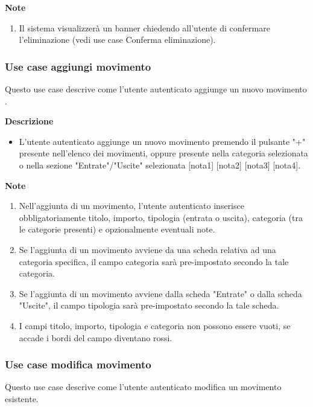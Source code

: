 \documentclass[a4paper,12pt]{article}
\begin{document}
\textbf{Note}
\begin{enumerate} \setlength\itemsep{0.01em}
\item Il sistema visualizzerà un banner chiedendo all'utente di confermare l'eliminazione  (vedi use case Conferma eliminazione).
\end{enumerate}



\subsubsection*{Use case aggiungi movimento}

Questo use case descrive come l'utente autenticato aggiunge un nuovo movimento .

\textbf{Descrizione}
\begin{itemize} \setlength\itemsep{0.01em}
\item L'utente autenticato aggiunge un nuovo movimento premendo il pulsante "+" presente nell'elenco dei movimenti, oppure presente nella categoria selezionata o nella sezione "Entrate"/"Uscite" selezionata [nota1] [nota2] [nota3] [nota4].
\end{itemize}

\textbf{Note}
\begin{enumerate} \setlength\itemsep{0.01em}
\item Nell'aggiunta di un movimento, l'utente autenticato inserisce obbligatoriamente titolo, importo, tipologia (entrata o uscita), categoria (tra le categorie presenti) e opzionalmente eventuali note.
\item Se l'aggiunta di un movimento avviene da una scheda relativa ad una categoria specifica, il campo categoria sarà pre-impostato secondo la tale categoria.
\item Se l'aggiunta di un movimento avviene dalla scheda "Entrate" o dalla scheda "Uscite", il campo tipologia sarà pre-impostato secondo la tale scheda.
\item I campi titolo, importo, tipologia e categoria non possono essere vuoti, se accade i bordi del campo diventano rossi.
\end{enumerate}


\subsubsection*{Use case modifica movimento}

Questo use case descrive come l'utente autenticato modifica un movimento esistente.
\end{document}

